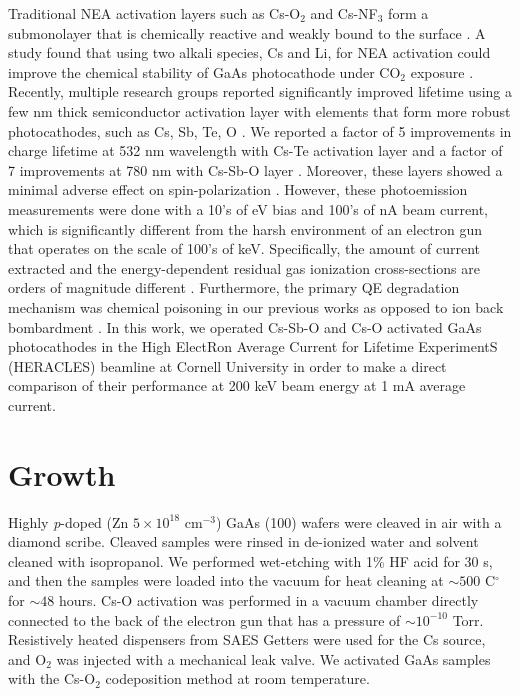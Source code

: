 Traditional NEA activation layers such as Cs-O$_2$ and Cs-NF$_3$ form a submonolayer that is chemically reactive and weakly bound to the surface \cite{kuriki2011_DarklifetimeDegradationGaAs,chanlek2014_DegradationQuantumEfficiency}.
A study found that using two alkali species, Cs and Li, for NEA activation could improve the chemical stability of GaAs photocathode under CO$_2$ exposure \cite{mulhollan2008_EnhancedChemicalImmunity,sun2009_SurfaceActivationLayer,kurichiyanil2019test}.
Recently, multiple research groups reported significantly improved lifetime using a few nm thick semiconductor activation layer with elements that form more robust photocathodes, such as Cs, Sb, Te, O \cite{kuriki2019_NegativeElectronAffinity,biswas2021_HighQuantumEfficiency, rahman2019_NewActivationTechniques}.
We reported a factor of 5 improvements in charge lifetime at 532 nm wavelength with Cs-Te activation layer \cite{bae2018_RuggedSpinpolarizedElectron} and a factor of 7 improvements at 780 nm with Cs-Sb-O layer \cite{bae2020_ImprovedLifetimeHigh}. Moreover, these layers showed a minimal adverse effect on spin-polarization \cite{bae2018_RuggedSpinpolarizedElectron,bae2020_ImprovedLifetimeHigh,cultrera2020_LongLifetimePolarized}.
However, these photoemission measurements were done with a 10's of eV bias and 100's of nA beam current, which is significantly different from the harsh environment of an electron gun that operates on the scale of 100's of keV. Specifically, the amount of current extracted and the energy-dependent residual gas ionization cross-sections are orders of magnitude different \cite{grames2011_ChargeFluenceLifetime}. Furthermore, the primary QE degradation mechanism was chemical poisoning in our previous works as opposed to ion back bombardment \cite{cultrera2020_LongLifetimePolarized}. In this work, we operated Cs-Sb-O and Cs-O activated GaAs photocathodes in the High ElectRon Average Current for Lifetime ExperimentS (HERACLES) beamline at Cornell University in order to make a direct comparison of their performance at 200 keV beam energy at 1 mA average current. 


\section{Growth}

Highly \emph{p}-doped (Zn $5 \times 10^{18}$ cm$^{-3}$) GaAs (100) wafers were cleaved in air with a diamond scribe. Cleaved samples were rinsed in de-ionized water and solvent cleaned with isopropanol. We performed wet-etching with 1\% HF acid for 30 s, and then the samples were loaded into the vacuum for heat cleaning at $\sim 500$ C$^\circ$  for $\sim 48$ hours.
Cs-O activation was performed in a vacuum chamber directly connected to the back of the electron gun that has a pressure of $\sim 10^{-10}$ Torr. Resistively heated dispensers from SAES Getters were used for the Cs source, and O$_2$ was injected with a mechanical leak valve. We activated GaAs samples with the Cs-O$_2$ codeposition method at room temperature.

